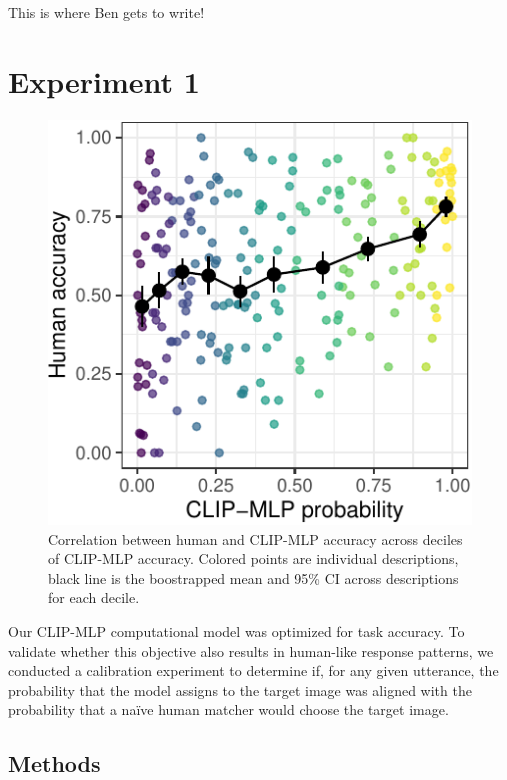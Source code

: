 \documentclass[10pt, letterpaper]{article}
\begin{document}
This is where Ben gets to write!

\section{Experiment 1}\label{experiment-1}

\begin{CodeChunk}
\begin{figure}[t]

{\centering \includegraphics[width=0.7\linewidth]{figs/fig-calibration-1} 

}

\caption[Correlation between human and CLIP-MLP accuracy across deciles of CLIP-MLP accuracy]{Correlation between human and CLIP-MLP accuracy across deciles of CLIP-MLP accuracy. Colored points are individual descriptions, black line is the boostrapped mean and 95\% CI across descriptions for each decile. \label{calibration}}\label{fig:fig-calibration}
\end{figure}
\end{CodeChunk}

Our CLIP-MLP computational model was optimized for task accuracy. To
validate whether this objective also results in human-like response
patterns, we conducted a calibration experiment to determine if, for any
given utterance, the probability that the model assigns to the target
image was aligned with the probability that a naïve human matcher would
choose the target image.

\subsection{Methods}\label{methods}
\end{document}
